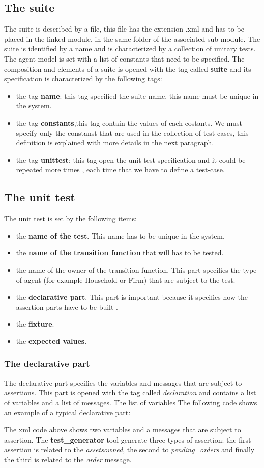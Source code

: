 \documentclass[a4paper,10pt]{article}
\begin{document}
\subsection{The suite}
The suite is described by a file, this file has the extension .xml and  has to be placed in the linked module, in the same folder of the associated sub-module. The suite is identified by a name and is characterized by a collection of unitary tests. The agent model is set with a list of constants that need to be specified.
The composition and elements of a suite is opened with the tag called \textbf{suite} and its specification is characterized by the following tags:

\begin{itemize}
\item the tag \textbf{name}: this tag specified the suite name, this name must be unique in the system.
\item the tag \textbf{constants},this tag contain the values of each costants. We must specify only the constanst that are used in the collection of test-cases, this definition is explained with more details in the next paragraph.
\item the tag \textbf{unittest}: this tag open the unit-test specification and it could be repeated more times , each time that we have to define a test-case.
\end{itemize}
\subsection{The unit test}
The  unit test is set by the following items:
\begin{itemize}
\item the \textbf{name of the test}. This name has to be unique in the  system.
\item the \textbf{name of the transition function} that will has to be tested.
\item the name of the owner of the transition function. This part specifies the type of agent (for example Household or Firm) that are subject to the test.
\item the \textbf{declarative part}. This part is important because it specifies how the assertion parts have to be built .
\item the \textbf{fixture}. 
\item the \textbf{expected values}.
\end{itemize}
\subsubsection{The declarative part}
The declarative part specifies the variables and messages that are subject to assertions. This part is opened with the tag called \textit{declaration} and contains a list of variables and a list of messages. The list of variables 
The following code shows an example of a typical declarative part:

The xml code above shows two variables and a messages that are subject to assertion. The \textbf{test\_generator} tool generate three types of assertion: the first assertion is related to the \textit{assetsowned}, the second to \textit{pending\_orders } and finally the third is related to the \textit{order }message.
\end{document}
